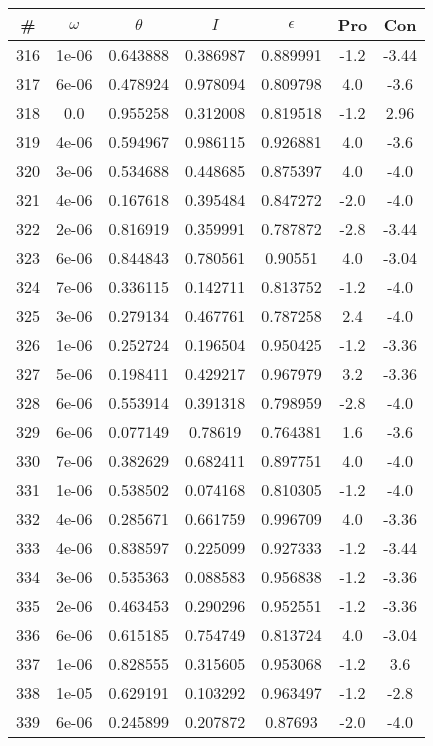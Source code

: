 \begin{table}
\begin{tabular}{c|c|c|c|c|c|c}
\# & $\omega$ & $\theta$ & $I$ & $\epsilon$ & Pro & Con\\
\hline
316 & 1e-06 & 0.643888 & 0.386987 & 0.889991 & -1.2 & -3.44\\
317 & 6e-06 & 0.478924 & 0.978094 & 0.809798 & 4.0 & -3.6\\
318 & 0.0 & 0.955258 & 0.312008 & 0.819518 & -1.2 & 2.96\\
319 & 4e-06 & 0.594967 & 0.986115 & 0.926881 & 4.0 & -3.6\\
320 & 3e-06 & 0.534688 & 0.448685 & 0.875397 & 4.0 & -4.0\\
321 & 4e-06 & 0.167618 & 0.395484 & 0.847272 & -2.0 & -4.0\\
322 & 2e-06 & 0.816919 & 0.359991 & 0.787872 & -2.8 & -3.44\\
323 & 6e-06 & 0.844843 & 0.780561 & 0.90551 & 4.0 & -3.04\\
324 & 7e-06 & 0.336115 & 0.142711 & 0.813752 & -1.2 & -4.0\\
325 & 3e-06 & 0.279134 & 0.467761 & 0.787258 & 2.4 & -4.0\\
326 & 1e-06 & 0.252724 & 0.196504 & 0.950425 & -1.2 & -3.36\\
327 & 5e-06 & 0.198411 & 0.429217 & 0.967979 & 3.2 & -3.36\\
328 & 6e-06 & 0.553914 & 0.391318 & 0.798959 & -2.8 & -4.0\\
329 & 6e-06 & 0.077149 & 0.78619 & 0.764381 & 1.6 & -3.6\\
330 & 7e-06 & 0.382629 & 0.682411 & 0.897751 & 4.0 & -4.0\\
331 & 1e-06 & 0.538502 & 0.074168 & 0.810305 & -1.2 & -4.0\\
332 & 4e-06 & 0.285671 & 0.661759 & 0.996709 & 4.0 & -3.36\\
333 & 4e-06 & 0.838597 & 0.225099 & 0.927333 & -1.2 & -3.44\\
334 & 3e-06 & 0.535363 & 0.088583 & 0.956838 & -1.2 & -3.36\\
335 & 2e-06 & 0.463453 & 0.290296 & 0.952551 & -1.2 & -3.36\\
336 & 6e-06 & 0.615185 & 0.754749 & 0.813724 & 4.0 & -3.04\\
337 & 1e-06 & 0.828555 & 0.315605 & 0.953068 & -1.2 & 3.6\\
338 & 1e-05 & 0.629191 & 0.103292 & 0.963497 & -1.2 & -2.8\\
339 & 6e-06 & 0.245899 & 0.207872 & 0.87693 & -2.0 & -4.0\\

\end{tabular}
\end{table}
